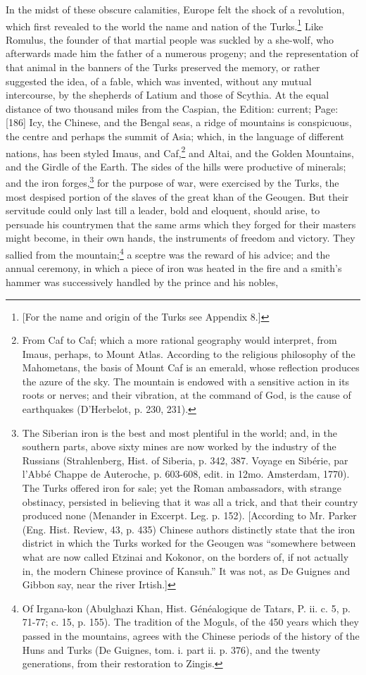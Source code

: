 In the midst of these obscure calamities, Europe felt the shock of a revolution, which first revealed to the world the name and nation of the Turks.\footnote{[For the name and origin of the Turks see Appendix 8.]} Like Romulus, the founder of that martial people was suckled by a she-wolf, who afterwards made him the father of a numerous progeny; and the representation of that animal in the banners of the Turks preserved the memory, or rather suggested the idea, of a fable, which was invented, without any mutual intercourse, by the shepherds of Latium and those of Scythia. At the equal distance of two thousand miles from the Caspian, the Edition: current; Page: [186] Icy, the Chinese, and the Bengal seas, a ridge of mountains is conspicuous, the centre and perhaps the summit of Asia; which, in the language of different nations, has been styled Imaus, and Caf,\footnote{From Caf to Caf; which a more rational geography would interpret, from Imaus, perhaps, to Mount Atlas. According to the religious philosophy of the Mahometans, the basis of Mount Caf is an emerald, whose reflection produces the azure of the sky. The mountain is endowed with a sensitive action in its roots or nerves; and their vibration, at the command of God, is the cause of earthquakes (D\texthebrew{}’Herbelot, p. 230, 231).} and Altai, and the Golden Mountains, and the Girdle of the Earth. The sides of the hills were productive of minerals; and the iron forges,\footnote{The Siberian iron is the best and most plentiful in the world; and, in the southern parts, above sixty mines are now worked by the industry of the Russians (Strahlenberg, Hist. of Siberia, p. 342, 387. Voyage en Sibérie, par l\texthebrew{}’Abbé Chappe de Auteroche, p. 603-608, edit. in 12mo. Amsterdam, 1770). The Turks offered iron for sale; yet the Roman ambassadors, with strange obstinacy, persisted in believing that it was all a trick, and that their country produced none (Menander in Excerpt. Leg. p. 152). [According to Mr. Parker (Eng. Hist. Review, 43, p. 435) Chinese authors distinctly state that the iron district in which the Turks worked for the Geougen was \texthebrew{“}somewhere between what are now called Etzinai and Kokonor, on the borders of, if not actually in, the modern Chinese province of Kansuh.\texthebrew{}” It was not, as De Guignes and Gibbon say, near the river Irtish.]} for the purpose of war, were exercised by the Turks, the most despised portion of the slaves of the great khan of the Geougen. But their servitude could only last till a leader, bold and eloquent, should arise, to persuade his countrymen that the same arms which they forged for their masters might become, in their own hands, the instruments of freedom and victory. They sallied from the mountain;\footnote{Of Irgana-kon (Abulghazi Khan, Hist. Généalogique de Tatars, P. ii. c. 5, p. 71-77; c. 15, p. 155). The tradition of the Moguls, of the 450 years which they passed in the mountains, agrees with the Chinese periods of the history of the Huns and Turks (De Guignes, tom. i. part ii. p. 376), and the twenty generations, from their restoration to Zingis.} a sceptre was the reward of his advice; and the annual ceremony, in which a piece of iron was heated in the fire and a smith\texthebrew{}’s hammer was successively handled by the prince and his nobles, 
